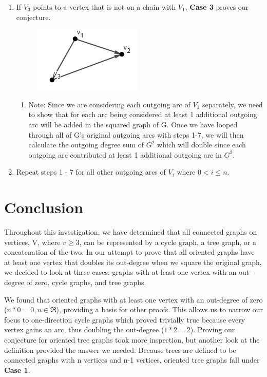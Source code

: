 \documentclass{article}
\begin{document}
\begin{flushleft}
\begin{enumerate}
\begin{enumerate}
\end{enumerate}
\item If $V_3$ points to a vertex that is not on a chain with $V_1$, \textbf{Case 3} proves our conjecture.
\begin{figure}[ht]
\centering
\includegraphics{32.PNG}
\end{figure}
\begin{enumerate}
\item Note: Since we are considering each outgoing arc of $V_1$ separately, we need to show that for each arc being considered at least 1 additional outgoing arc will be added in the squared graph of G. Once we have looped through all of G’s original outgoing arcs with steps 1-7, we will then calculate the outgoing degree sum of $G^2$ which will double since each outgoing arc contributed at least 1 additional outgoing arc in $G^2$.
\end{enumerate}
\item Repeat steps 1 - 7 for all other outgoing arcs of $V_i$ where $0<i\leq n$.

\end{enumerate}
\end{flushleft}

\section{Conclusion}
Throughout this investigation, we have determined that all connected graphs on vertices, V, where $v\geq3$, can be represented by a cycle graph, a tree graph, or a concatenation of the two. In our attempt to prove that all oriented graphs have at least one vertex that doubles its out-degree when we square the original graph, we decided to look at three cases: graphs with at least one vertex with an out-degree of zero, cycle graphs, and tree graphs.

We found that oriented graphs with at least one vertex with an out-degree of zero ($n*0=0,n\in\Re$), providing a basis for other proofs. This allows us to narrow our focus to one-direction cycle graphs which proved trivially true because every vertex gains an arc, thus doubling the out-degree ($1*2=2$). Proving our conjecture for oriented tree graphs took more inspection, but another look at the definition provided the answer we needed. Because trees are defined to be connected graphs with n vertices and n-1 vertices, oriented tree graphs fall under \textbf{Case 1}.
\end{document}
